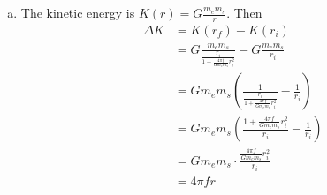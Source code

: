 \documentclass{esg8012pset}
\begin{document}
\begin{solution}
\begin{solution}
\begin{enumerate}[(a)]
  \item The kinetic energy is $K(r) = G \frac{m_e m_s}{r}$.  Then \begin{align*}
 \Delta K & = K(r_f) - K(r_i) \\
  & = G \frac{m_e m_s}{\frac{r_i}{1 + \frac{4\pi f}{G m_e m_s} r_i^2}} - G \frac{m_e m_s}{r_i} \\
  & = G m_e m_s \left( \frac{1}{\frac{r_i}{1 + \frac{4\pi f}{G m_e m_s} r_i^2}} - \frac{1}{r_i}\right) \\
  & = G m_e m_s \left( \frac{1 + \frac{4\pi f}{G m_e m_s} r_i^2}{r_i} - \frac{1}{r_i}\right) \\
  & = G m_e m_s\cdot \frac{\frac{4\pi f}{G m_e m_s} r_i^2}{r_i} \\
  & = 4\pi f r
\end{align*}
\end{enumerate}
\end{solution}



\end{solution}
\end{document}
